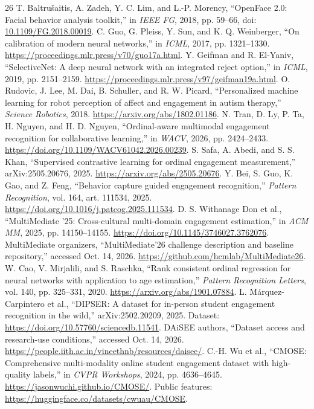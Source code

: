 \documentclass[a4paper,conference]{IEEEtran}
\begin{document}
\begin{thebibliography}{26}
 T. Baltru\v{s}aitis, A. Zadeh, Y. C. Lim, and L.-P. Morency, ``OpenFace 2.0: Facial behavior analysis toolkit,'' in \emph{IEEE FG}, 2018, pp. 59--66, doi: \href{https://doi.org/10.1109/FG.2018.00019}{10.1109/FG.2018.00019}.
 C. Guo, G. Pleiss, Y. Sun, and K. Q. Weinberger, ``On calibration of modern neural networks,'' in \emph{ICML}, 2017, pp. 1321--1330. \url{https://proceedings.mlr.press/v70/guo17a.html}.
 Y. Geifman and R. El-Yaniv, ``SelectiveNet: A deep neural network with an integrated reject option,'' in \emph{ICML}, 2019, pp. 2151--2159. \url{https://proceedings.mlr.press/v97/geifman19a.html}.
 O. Rudovic, J. Lee, M. Dai, B. Schuller, and R. W. Picard, ``Personalized machine learning for robot perception of affect and engagement in autism therapy,'' \emph{Science Robotics}, 2018. \url{https://arxiv.org/abs/1802.01186}.
 N. Tran, D. Ly, P. Ta, H. Nguyen, and H. D. Nguyen, ``Ordinal-aware multimodal engagement recognition for collaborative learning,'' in \emph{WACV}, 2026, pp. 2424--2433. \url{https://doi.org/10.1109/WACV61042.2026.00239}.
 S. Safa, A. Abedi, and S. S. Khan, ``Supervised contrastive learning for ordinal engagement measurement,'' arXiv:2505.20676, 2025. \url{https://arxiv.org/abs/2505.20676}.
 Y. Bei, S. Guo, K. Gao, and Z. Feng, ``Behavior capture guided engagement recognition,'' \emph{Pattern Recognition}, vol. 164, art. 111534, 2025. \url{https://doi.org/10.1016/j.patcog.2025.111534}.
 D. S. Withanage Don et al., ``MultiMediate '25: Cross-cultural multi-domain engagement estimation,'' in \emph{ACM MM}, 2025, pp. 14150--14155. \url{https://doi.org/10.1145/3746027.3762076}.
 MultiMediate organizers, ``MultiMediate'26 challenge description and baseline repository,'' accessed Oct. 14, 2026. \url{https://github.com/hcmlab/MultiMediate26}.
 W. Cao, V. Mirjalili, and S. Raschka, ``Rank consistent ordinal regression for neural networks with application to age estimation,'' \emph{Pattern Recognition Letters}, vol. 140, pp. 325--331, 2020. \url{https://arxiv.org/abs/1901.07884}.
 L. M\'arquez-Carpintero et al., ``DIPSER: A dataset for in-person student engagement recognition in the wild,'' arXiv:2502.20209, 2025. Dataset: \url{https://doi.org/10.57760/sciencedb.11541}.
 DAiSEE authors, ``Dataset access and research-use conditions,'' accessed Oct. 14, 2026. \url{https://people.iith.ac.in/vineethnb/resources/daisee/}.
 C.-H. Wu et al., ``CMOSE: Comprehensive multi-modality online student engagement dataset with high-quality labels,'' in \emph{CVPR Workshops}, 2024, pp. 4636--4645. \url{https://jasonwuchi.github.io/CMOSE/}. Public features: \url{https://huggingface.co/datasets/cwuau/CMOSE}.
\end{thebibliography}
\clearpage

\end{document}
